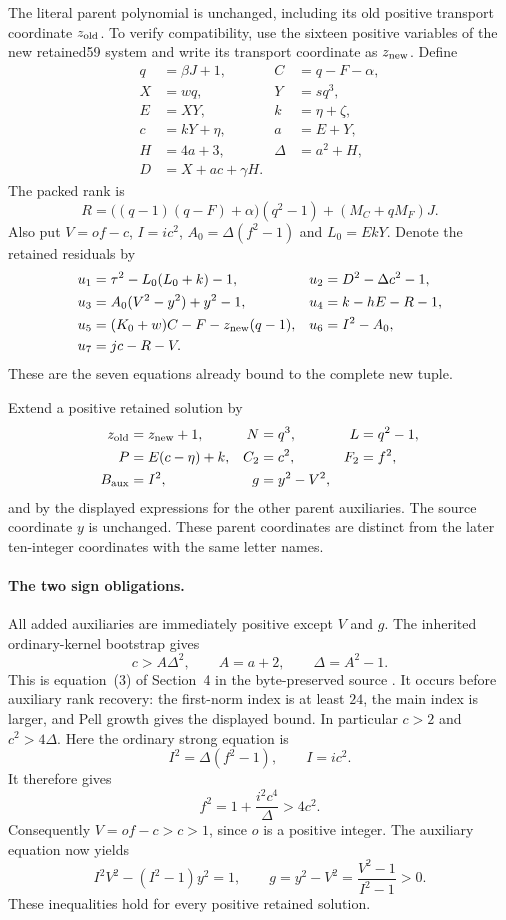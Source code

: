 The literal parent polynomial is unchanged, including its old positive
transport coordinate $z_{\rm old}$.  To verify compatibility, use the
sixteen positive variables of the new retained59 system and write its
transport coordinate as $z_{\rm new}$.  Define
\begin{align*}
 q&=\beta J+1,& C&=q-F-\alpha,\\
 X&=wq,&Y&=sq^3,\\
 E&=XY,& k&=\eta+\zeta,\\
 c&=kY+\eta,& a&=E+Y,\\
 H&=4a+3,&\Delta&=a^2+H,\\
 D&=X+ac+\gamma H.
\end{align*}
The packed rank is
\[
 R=\bigl((q-1)(q-F)+\alpha\bigr)(q^2-1)
                  +(M_C+qM_F)J.
\]
Also put $V=of-c$, $I=ic^2$, $A_0=\Delta(f^2-1)$ and
$L_0=EkY$.  Denote the retained residuals by
\begin{align*}
 u_1&=\tau^2-L_0(L_0+k)-1,&
 u_2&=D^2-\Delta c^2-1,\\
 u_3&=A_0(V^2-y^2)+y^2-1,&
 u_4&=k-hE-R-1,\\
 u_5&=(K_0+w)C-F-z_{\rm new}(q-1),&
 u_6&=I^2-A_0,\\
 u_7&=jc-R-V.
\end{align*}
These are the seven equations already bound to the complete new tuple.

Extend a positive retained solution by
\begin{align*}
 z_{\rm old}&=z_{\rm new}+1,& N&=q^3,&L&=q^2-1,\\
 P&=E(c-\eta)+k,&C_2&=c^2,&F_2&=f^2,\\
 B_{\rm aux}&=I^2,&g&=y^2-V^2,
\end{align*}
and by the displayed expressions for the other parent auxiliaries.
The source coordinate $y$ is unchanged.  These parent coordinates
are distinct from the later ten-integer coordinates with the same
letter names.

\paragraph{The two sign obligations.}
All added auxiliaries are immediately positive except $V$ and $g$.
The inherited ordinary-kernel bootstrap gives
\[
 c>A\Delta^2,\qquad A=a+2,\qquad\Delta=A^2-1.
\]
This is equation~(3) of Section~4 in the byte-preserved source
.  It occurs before
auxiliary rank recovery: the first-norm index is at least $24$, the
main index is larger, and Pell growth gives the displayed bound.
In particular $c>2$ and $c^2>4\Delta$.  Here the ordinary strong
equation is
\[
 I^2=\Delta(f^2-1),\qquad I=ic^2.
\]
It therefore gives
\[
 f^2=1+\frac{i^2c^4}{\Delta}>4c^2.
\]
Consequently $V=of-c>c>1$, since $o$ is a positive integer.
The auxiliary equation now yields
\[
 I^2V^2-(I^2-1)y^2=1,\qquad
 g=y^2-V^2=\frac{V^2-1}{I^2-1}>0.
\]
These inequalities hold for every positive retained solution.


